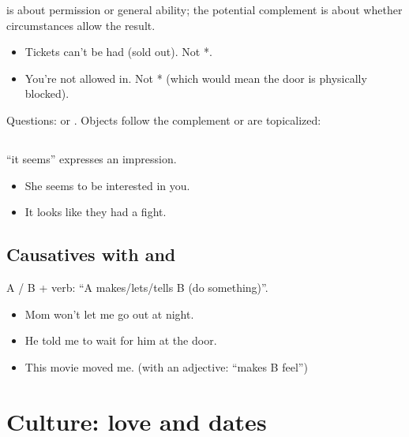 \begin{important}
 is about permission or general ability; the potential complement is about
whether circumstances allow the result.
\begin{itemize}
  \item {} Tickets can't be had (sold out). Not *.
  \item {} You're not allowed in. Not * (which would mean the
        door is physically blocked).
\end{itemize}
Questions:  or . Objects follow the complement
or are topicalized: 
\end{important}

\subsection{}

 ``it seems'' expresses an impression.
\begin{itemize}
  \item {} She seems to be interested in you.
  \item {} It looks like they had a fight.
\end{itemize}

\subsection{Causatives with  and }

A / B + verb: ``A makes/lets/tells B (do something)''.
\begin{itemize}
  \item {} Mom won't let me go out at night.
  \item {} He told me to wait for him at the door.
  \item {} This movie moved me. (with an adjective: ``makes B feel'')
\end{itemize}

\section{Culture: love and dates}

